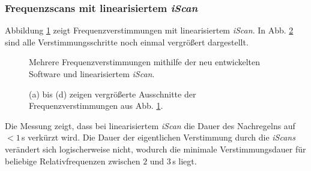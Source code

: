 \subsubsection{Frequenzscans mit linearisiertem
\textit{iScan}}\label{subsubsec:frequenz_scans_lineares_iScan}
Abbildung \ref{fig:laserscan_LUT-kalibriert} zeigt
Frequenzverstimmungen mit linearisiertem \textit{iScan}. In Abb.
\ref{fig:laserscan_LUT-kalibriert_zoom} sind alle Verstimmungsschritte noch
einmal vergrößert dargestellt.
\begin{figure}[h]
	 	\centering
	 	\footnotesize
 		
		\caption[Frequenzscan, linearisiertes \textit{iScan}]{Mehrere
		Frequenzverstimmungen mithilfe der neu entwickelten Software und
		linearisiertem \textit{iScan}.}
		\label{fig:laserscan_LUT-kalibriert}
\end{figure}
\begin{figure}[hp]
 	\centering
 	\footnotesize
	\caption[Frequenzscan, linearisisiertes \textit{iScan}, vergrößert]{(a) bis (d)
	zeigen vergrößerte Ausschnitte der Frequenzverstimmungen aus Abb.
	\ref{fig:laserscan_LUT-kalibriert}.}
	\label{fig:laserscan_LUT-kalibriert_zoom}
\end{figure}
Die Messung zeigt, dass bei linearisiertem \textit{iScan} die Dauer des
Nachregelns auf $<1\,$s verkürzt wird. Die Dauer der eigentlichen
Verstimmung durch die \textit{iScans} verändert sich logischerweise nicht,
wodurch die minimale Verstimmungsdauer für beliebige Relativfrequenzen zwischen
$2$ und $3\,$s liegt.

